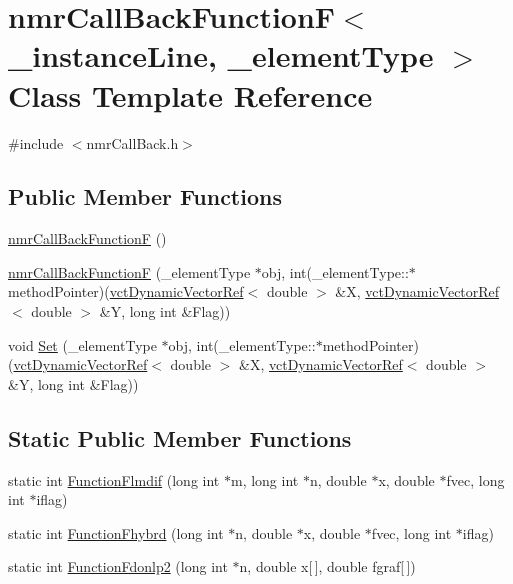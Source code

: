 \hypertarget{classnmr_call_back_function_f}{}\section{nmr\+Call\+Back\+Function\+F$<$ \+\_\+instance\+Line, \+\_\+element\+Type $>$ Class Template Reference}
\label{classnmr_call_back_function_f}


{\ttfamily \#include $<$nmr\+Call\+Back.\+h$>$}

\subsection*{Public Member Functions}
\begin{DoxyCompactItemize}
\item 
\hyperlink{classnmr_call_back_function_f_a503a8c5e30192b9ba98e5d354043d5f3}{nmr\+Call\+Back\+Function\+F} ()
\item 
\hyperlink{classnmr_call_back_function_f_ac80a751c5c2863acab71971ca058d35c}{nmr\+Call\+Back\+Function\+F} (\+\_\+element\+Type $\ast$obj, int(\+\_\+element\+Type\+::$\ast$method\+Pointer)(\hyperlink{classvct_dynamic_vector_ref}{vct\+Dynamic\+Vector\+Ref}$<$ double $>$ \&X, \hyperlink{classvct_dynamic_vector_ref}{vct\+Dynamic\+Vector\+Ref}$<$ double $>$ \&Y, long int \&Flag))
\item 
void \hyperlink{classnmr_call_back_function_f_ac80177c8b4d6276bfbcd8f554c09bc73}{Set} (\+\_\+element\+Type $\ast$obj, int(\+\_\+element\+Type\+::$\ast$method\+Pointer)(\hyperlink{classvct_dynamic_vector_ref}{vct\+Dynamic\+Vector\+Ref}$<$ double $>$ \&X, \hyperlink{classvct_dynamic_vector_ref}{vct\+Dynamic\+Vector\+Ref}$<$ double $>$ \&Y, long int \&Flag))
\end{DoxyCompactItemize}
\subsection*{Static Public Member Functions}
\begin{DoxyCompactItemize}
\item 
static int \hyperlink{classnmr_call_back_function_f_a3d3c1e5cf266c8257be54c81a6bfc2be}{Function\+Flmdif} (long int $\ast$m, long int $\ast$n, double $\ast$x, double $\ast$fvec, long int $\ast$iflag)
\item 
static int \hyperlink{classnmr_call_back_function_f_ab248cbd9d02d4969bb8e9e3c6d0d8e6c}{Function\+Fhybrd} (long int $\ast$n, double $\ast$x, double $\ast$fvec, long int $\ast$iflag)
\item 
static int \hyperlink{classnmr_call_back_function_f_ac0dda9815ccf046edc764ad6e66e3435}{Function\+Fdonlp2} (long int $\ast$n, double x\mbox{[}$\,$\mbox{]}, double fgraf\mbox{[}$\,$\mbox{]})
\end{DoxyCompactItemize}
